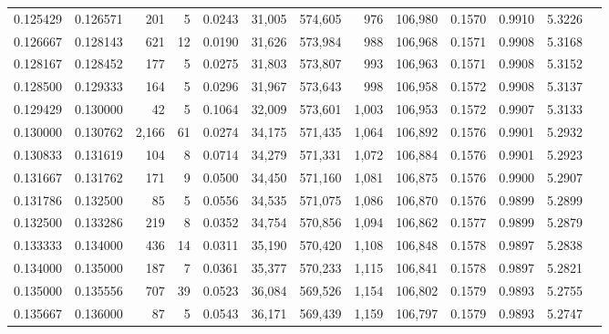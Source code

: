 \begin{tabular}{rrrrrrrrrrrrr}
0.125429 & 0.126571 &   201 &   5 &                                     0.0243 &  31,005 & 574,605 &     976 & 106,980 & 0.1570 & 0.9910 & 5.3226 \\
0.126667 & 0.128143 &   621 &  12 &                                     0.0190 &  31,626 & 573,984 &     988 & 106,968 & 0.1571 & 0.9908 & 5.3168 \\
0.128167 & 0.128452 &   177 &   5 &                                     0.0275 &  31,803 & 573,807 &     993 & 106,963 & 0.1571 & 0.9908 & 5.3152 \\
0.128500 & 0.129333 &   164 &   5 &                                     0.0296 &  31,967 & 573,643 &     998 & 106,958 & 0.1572 & 0.9908 & 5.3137 \\
0.129429 & 0.130000 &    42 &   5 &                                     0.1064 &  32,009 & 573,601 &   1,003 & 106,953 & 0.1572 & 0.9907 & 5.3133 \\
0.130000 & 0.130762 & 2,166 &  61 &                                     0.0274 &  34,175 & 571,435 &   1,064 & 106,892 & 0.1576 & 0.9901 & 5.2932 \\
0.130833 & 0.131619 &   104 &   8 &                                     0.0714 &  34,279 & 571,331 &   1,072 & 106,884 & 0.1576 & 0.9901 & 5.2923 \\
0.131667 & 0.131762 &   171 &   9 &                                     0.0500 &  34,450 & 571,160 &   1,081 & 106,875 & 0.1576 & 0.9900 & 5.2907 \\
0.131786 & 0.132500 &    85 &   5 &                                     0.0556 &  34,535 & 571,075 &   1,086 & 106,870 & 0.1576 & 0.9899 & 5.2899 \\
0.132500 & 0.133286 &   219 &   8 &                                     0.0352 &  34,754 & 570,856 &   1,094 & 106,862 & 0.1577 & 0.9899 & 5.2879 \\
0.133333 & 0.134000 &   436 &  14 &                                     0.0311 &  35,190 & 570,420 &   1,108 & 106,848 & 0.1578 & 0.9897 & 5.2838 \\
0.134000 & 0.135000 &   187 &   7 &                                     0.0361 &  35,377 & 570,233 &   1,115 & 106,841 & 0.1578 & 0.9897 & 5.2821 \\
0.135000 & 0.135556 &   707 &  39 &                                     0.0523 &  36,084 & 569,526 &   1,154 & 106,802 & 0.1579 & 0.9893 & 5.2755 \\
0.135667 & 0.136000 &    87 &   5 &                                     0.0543 &  36,171 & 569,439 &   1,159 & 106,797 & 0.1579 & 0.9893 & 5.2747 \\

\end{tabular}

